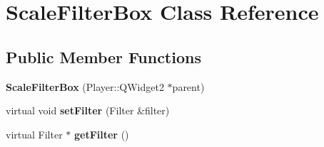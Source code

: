 \hypertarget{classScaleFilterBox}{}\section{Scale\+Filter\+Box Class Reference}
\label{classScaleFilterBox}
\subsection*{Public Member Functions}
\begin{DoxyCompactItemize}
\item 
\hypertarget{classScaleFilterBox_a51b6fe44bf1b5104db95b7cb7f2eee46}{}{\bfseries Scale\+Filter\+Box} (Player\+::\+Q\+Widget2 $\ast$parent)\label{classScaleFilterBox_a51b6fe44bf1b5104db95b7cb7f2eee46}

\item 
\hypertarget{classScaleFilterBox_a09e99b0db09b8468ce7d7e0f98293ac5}{}virtual void {\bfseries set\+Filter} (Filter \&filter)\label{classScaleFilterBox_a09e99b0db09b8468ce7d7e0f98293ac5}

\item 
\hypertarget{classScaleFilterBox_ad7b14770615490d1445c958c79fd3adb}{}virtual Filter $\ast$ {\bfseries get\+Filter} ()\label{classScaleFilterBox_ad7b14770615490d1445c958c79fd3adb}

\end{DoxyCompactItemize}

